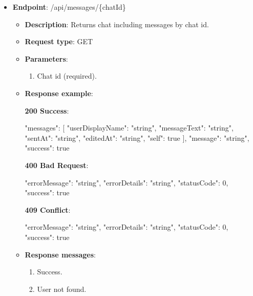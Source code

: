 \begin{itemize}
    \item \textbf{Endpoint}: /api/messages/\{chatId\}
    \begin{itemize}
        \item \textbf{Description}: Returns chat including messages by chat id.
        \item \textbf{Request type}: GET
        \item \textbf{Parameters}:
        \begin{enumerate}
            \item Chat id (required).
        \end{enumerate}

        \item \textbf{Response example}:

        \textbf{200 Success}:

        \begin{spverbatim}
        {
            "messages": [
                {
                "userDisplayName": "string",
                "messageText": "string",
                "sentAt": "string",
                "editedAt": "string",
                "self": true
            }
            ],
            "message": "string",
            "success": true
        }
        \end{spverbatim}

        \textbf{400 Bad Request}:

        \begin{spverbatim}
        {
            "errorMessage": "string",
            "errorDetails": "string",
            "statusCode": 0,
            "success": true
        }
        \end{spverbatim}

        \textbf{409 Conflict}:

        \begin{spverbatim}
        {
            "errorMessage": "string",
            "errorDetails": "string",
            "statusCode": 0,
            "success": true
        }
        \end{spverbatim}
        \item \textbf{Response messages}:
        \begin{enumerate}
            \item Success.
            \item User not found.
        \end{enumerate}
    \end{itemize}


\end{itemize}
